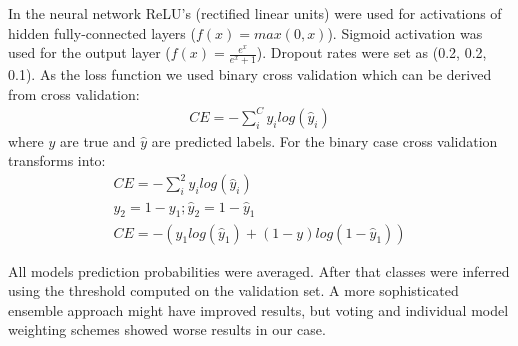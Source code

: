 \documentclass[11pt,a4paper]{article}
\begin{document}
In the neural network ReLU's (rectified linear units) were used for activations of hidden fully-connected layers ($f(x) = max(0, x)$). Sigmoid activation was used for the output layer ($f(x) = \frac{e^x}{e^x + 1}$). Dropout rates were set as (0.2, 0.2, 0.1). As the loss function we used binary cross validation which can be derived from cross validation:
\begin{align*}
 CE = -\sum_{i}^{C}y_{i} log (\hat{y}_{i})
\end{align*}
where $y$ are true and $\hat{y}$ are predicted labels.
For the binary case cross validation transforms into:
\begin{align*}
CE = -\sum_{i}^{2}y_{i} log (\hat{y}_{i}) \\
y_2 = 1 - y_1; \hat{y}_2 = 1 - \hat{y}_1 \\
CE = - (y_1log(\hat{y}_1) + (1 - y)log(1 - \hat{y}_1))
\end{align*}

All models prediction probabilities were averaged. After that classes were inferred using the threshold computed on the validation set. A more sophisticated ensemble approach might have improved results, but voting and individual model weighting schemes showed worse results in our case.
\end{document}
